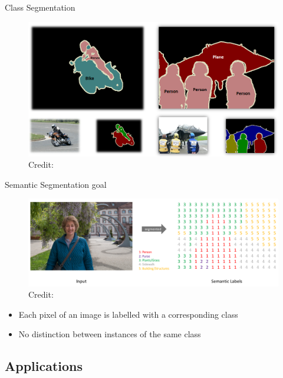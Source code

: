 \documentclass[12]{beamer}
\begin{document}
\begin{frame}{Class Segmentation}

\begin{figure}
\includegraphics[width=\textwidth]{segmentation_class}
\hspace*{5pt}\hbox{\scriptsize Credit:}
\end{figure}

\end{frame}

\begin{frame}{Semantic Segmentation goal}

\begin{figure}
\includegraphics[width=\textwidth]{goal}
\hspace*{5pt}\hbox{\scriptsize Credit:}
\end{figure}

\begin{itemize}
	\item Each pixel of an image is labelled with a corresponding class 
	\item No distinction between instances of the same class
\end{itemize}

\end{frame}



\subsection{Applications}
\end{document}
